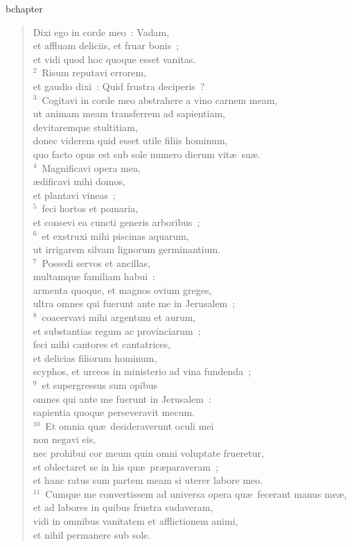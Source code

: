 bchapter\begin{verse}\vspace{-19pt}Dixi ego in corde meo~: Vadam,\\ et affluam deliciis, et fruar bonis~;\\ et vidi quod hoc quoque esset vanitas.\\
${}^{2}$~Risum reputavi errorem,\\ et gaudio dixi~: Quid frustra deciperis~?\\
${}^{3}$~Cogitavi in corde meo abstrahere a vino carnem meam,\\ ut animam meam transferrem ad sapientiam,\\ devitaremque stultitiam,\\ donec viderem quid esset utile filiis hominum,\\ quo facto opus est sub sole numero dierum vit\ae\ su\ae .\\
${}^{4}$~Magnificavi opera mea,\\ \ae dificavi mihi domos,\\ et plantavi vineas~;\\
${}^{5}$~feci hortos et pomaria,\\ et consevi ea cuncti generis arboribus~;\\
${}^{6}$~et exstruxi mihi piscinas aquarum,\\ ut irrigarem silvam lignorum germinantium.\\
${}^{7}$~Possedi servos et ancillas,\\ multamque familiam habui~:\\ armenta quoque, et magnos ovium greges,\\ ultra omnes qui fuerunt ante me in Jerusalem~;\\
${}^{8}$~coacervavi mihi argentum et aurum,\\ et substantias regum ac provinciarum~;\\ feci mihi cantores et cantatrices,\\ et delicias filiorum hominum,\\ scyphos, et urceos in ministerio ad vina fundenda~;\\
${}^{9}$~et supergressus sum opibus\\ omnes qui ante me fuerunt in Jerusalem~:\\ sapientia quoque perseveravit mecum.\\
${}^{10}$~Et omnia qu\ae\ desideraverunt oculi mei\\ non negavi eis,\\ nec prohibui cor meum quin omni voluptate frueretur,\\ et oblectaret se in his qu\ae\ pr\ae paraveram~;\\ et hanc ratus sum partem meam si uterer labore meo.\\
${}^{11}$~Cumque me convertissem ad universa opera qu\ae\ fecerant manus me\ae ,\\ et ad labores in quibus frustra sudaveram,\\ vidi in omnibus vanitatem et afflictionem animi,\\ et nihil permanere sub sole.\end{verse}


